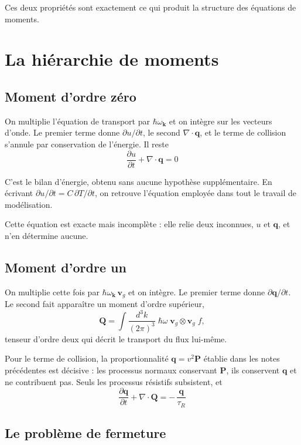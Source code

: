 \documentclass[11pt,a4paper]{article}
\begin{document}
Ces deux propriétés sont exactement ce qui produit la structure des équations de moments.

\section{La hiérarchie de moments}

\subsection{Moment d'ordre zéro}

On multiplie l'équation de transport par $\hbar\omega_\mathbf{k}$ et on intègre sur les vecteurs
d'onde. Le premier terme donne $\partial u/\partial t$, le second $\nabla \cdot \mathbf{q}$, et le
terme de collision s'annule par conservation de l'énergie. Il reste
\[ \boxed{\;\frac{\partial u}{\partial t} + \nabla \cdot \mathbf{q} = 0\;} \]

C'est le bilan d'énergie, obtenu sans aucune hypothèse supplémentaire. En écrivant
$\partial u/\partial t = C\,\partial T/\partial t$, on retrouve l'équation employée dans tout le
travail de modélisation.

Cette équation est exacte mais incomplète : elle relie deux inconnues, $u$ et $\mathbf{q}$, et n'en
détermine aucune.

\subsection{Moment d'ordre un}

On multiplie cette fois par $\hbar\omega_\mathbf{k}\,\mathbf{v}_g$ et on intègre. Le premier terme
donne $\partial \mathbf{q}/\partial t$. Le second fait apparaître un moment d'ordre supérieur,
\[ \mathbf{Q} = \int \frac{d^3k}{(2\pi)^3}\; \hbar\omega\; \mathbf{v}_g \otimes \mathbf{v}_g\; f , \]
tenseur d'ordre deux qui décrit le transport du flux lui-même.

Pour le terme de collision, la proportionnalité $\mathbf{q} = v^2 \mathbf{P}$ établie dans les notes
précédentes est décisive : les processus normaux conservant $\mathbf{P}$, ils conservent
$\mathbf{q}$ et ne contribuent pas. Seuls les processus résistifs subsistent, et
\[ \boxed{\;\frac{\partial \mathbf{q}}{\partial t} + \nabla \cdot \mathbf{Q}
= -\,\frac{\mathbf{q}}{\tau_R}\;} \]

\subsection{Le problème de fermeture}
\end{document}
